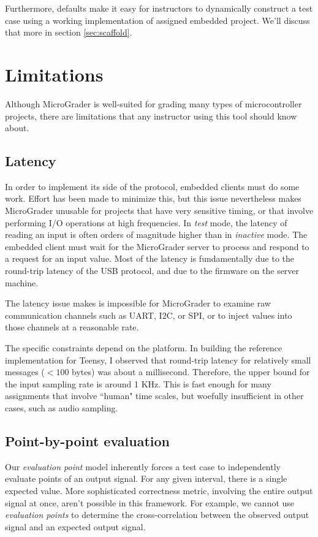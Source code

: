 \documentclass[12pt]{article}
\begin{document}
Furthermore, defaults make it easy for instructors to dynamically construct a test case using a working implementation of assigned embedded project.  We'll discuss that more in section \ref{sec:scaffold}.


\newpage
\section{Limitations}
Although MicroGrader is well-suited for grading many types of microcontroller projects, there are limitations that any instructor using this tool should know about.

\subsection{Latency}
In order to implement its side of the protocol, embedded clients must do some work.  Effort has been made to minimize this, but this issue nevertheless makes MicroGrader unusable for projects that have very sensitive timing, or that involve performing I/O operations at high frequencies.  In \textit{test} mode, the latency of reading an input is often orders of magnitude higher than in \textit{inactive} mode.  The embedded client must wait for the MicroGrader server to process and respond to a request for an input value.  Most of the latency is fundamentally due to the round-trip latency of the USB protocol, and due to the firmware on the server machine.

The latency issue makes is impossible for MicroGrader to examine raw communication channels such as UART, I2C, or SPI, or to inject values into those channels at a reasonable rate.

The specific constraints depend on the platform.  In building the reference implementation for Teensy, I observed that round-trip latency for relatively small messages ($<100$ bytes) was about a millisecond.  Therefore, the upper bound for the input sampling rate is around 1 KHz.  This is fast enough for many assignments that involve ``human" time scales, but woefully insufficient in other cases, such as audio sampling.

\subsection{Point-by-point evaluation}
Our \textit{evaluation point} model inherently forces a test case to independently evaluate points of an output signal.  For any given interval, there is a single expected value.   More sophisticated correctness metric, involving the entire output signal at once, aren't possible in this framework.  For example, we cannot use \textit{evaluation points} to determine the cross-correlation between the observed output signal and an expected output signal.
\end{document}
